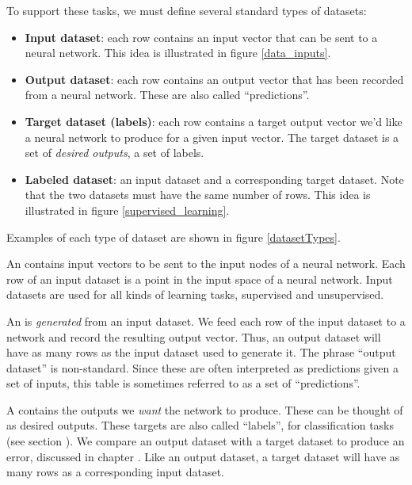 To support these tasks, we must define several standard types of datasets:
\begin{itemize}
\item \textbf{Input dataset}: each row contains an input vector that can be sent to a neural network. This idea is illustrated in figure \ref{data_inputs}.
\item \textbf{Output dataset}: each row contains an output vector that has been recorded from a neural network. These are also called ``predictions''. 
\item \textbf{Target dataset (labels)}: each row contains a target output vector we'd like a neural network to produce for a given input vector. The target dataset is a set of \emph{desired outputs}, a set of labels.
\item \textbf{Labeled dataset}: an input dataset and a corresponding target dataset. Note that the two datasets must have the same number of rows. This idea is illustrated in figure \ref{supervised_learning}.
\end{itemize}
Examples of each type of dataset are shown in figure \ref{datasetTypes}.


An  contains input vectors to be sent to the input nodes of a neural network. Each row of an input dataset is a point in the input space of a neural network. Input datasets are used for all kinds of learning tasks, supervised and unsupervised. 

An  is \emph{generated} from an input dataset. We feed each row of the input dataset to a network and record the resulting output vector. Thus, an output dataset will have as many rows as the input dataset used to generate it. The phrase ``output dataset'' is non-standard. Since these are often interpreted as predictions given a set of inputs, this table is sometimes referred to as a set  of ``predictions''. 

A  contains the outputs we \emph{want} the network to produce. These can be thought of as desired outputs. These targets are also called ``labels'', for classification tasks (see section ). We compare an output dataset with a target dataset to produce an error, discussed in chapter . Like an output dataset, a target dataset will have as many rows as a corresponding input dataset. 

